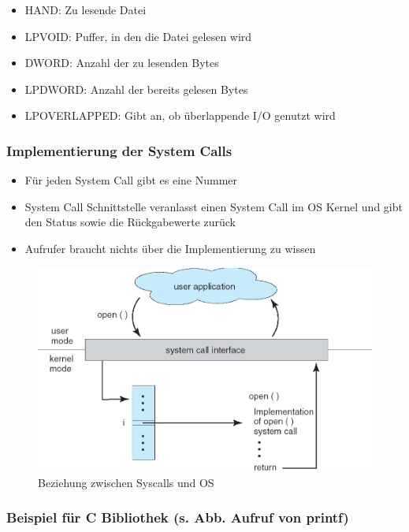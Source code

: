 \documentclass[a4paper]{scrreprt}
\begin{document}
\begin{itemize}
	\item HAND: Zu lesende Datei
	\item LPVOID: Puffer, in den die Datei gelesen wird
	\item DWORD: Anzahl der zu lesenden Bytes
	\item LPDWORD: Anzahl der bereits gelesen Bytes
	\item LPOVERLAPPED: Gibt an, ob überlappende I/O genutzt wird
\end{itemize}

\subsubsection{Implementierung der System Calls}
\begin{itemize}
	\item Für jeden System Call gibt es eine Nummer
	\item System Call Schnittstelle veranlasst einen System Call im OS Kernel und gibt den Status sowie die Rückgabewerte zurück
	\item Aufrufer braucht nichts über die Implementierung zu wissen
\end{itemize}

\begin{figure}[ht]
\centering
\includegraphics[scale=0.4]{graphics/syscall_os_relationship.png}
\caption{Beziehung zwischen Syscalls und OS}
\end{figure}

\subsubsection{Beispiel für C Bibliothek (s. Abb. Aufruf von printf)}
\end{document}
